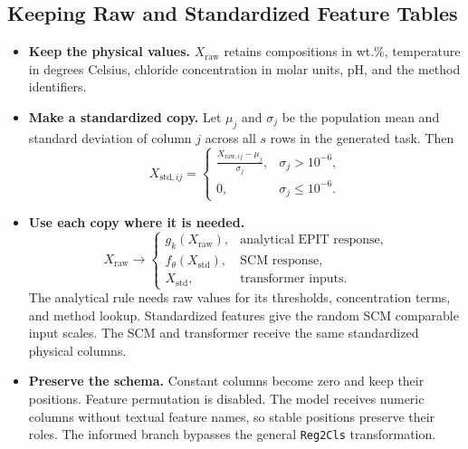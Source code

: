 \documentclass[11pt]{article}
\newenvironment{notes}
  {\begin{itemize}\setlength{\itemsep}{0.45em}\setlength{\parsep}{0pt}}
  {\end{itemize}}
\begin{document}
\subsection{Keeping Raw and Standardized Feature Tables}
\label{sec:feature-standardization}

\begin{notes}
    \item \textbf{Keep the physical values.}
    \(X_{\mathrm{raw}}\) retains compositions in wt.\%,
    temperature in degrees Celsius, chloride concentration in
    molar units, pH, and the method identifiers.

    \item \textbf{Make a standardized copy.}
    Let \(\mu_j\) and \(\sigma_j\) be the population mean and
    standard deviation of column \(j\) across all \(s\) rows
    in the generated task. Then
    \begin{equation}
        X_{\mathrm{std},ij}
        =
        \begin{cases}
            \displaystyle
            \frac{X_{\mathrm{raw},ij}-\mu_j}{\sigma_j},
                & \sigma_j>10^{-6},\\[6pt]
            0,  & \sigma_j\leq10^{-6}.
        \end{cases}
        \label{eq:feature-standardization}
    \end{equation}

    \item \textbf{Use each copy where it is needed.}
    \begin{equation}
        X_{\mathrm{raw}}\longrightarrow
        \begin{cases}
            g_k(X_{\mathrm{raw}}),
                & \text{analytical EPIT response},\\
            f_\theta(X_{\mathrm{std}}),
                & \text{SCM response},\\
            X_{\mathrm{std}},
                & \text{transformer inputs}.
        \end{cases}
        \label{eq:informed-pipeline}
    \end{equation}
    The analytical rule needs raw values for its thresholds,
    concentration terms, and method lookup. Standardized
    features give the random SCM comparable input scales.
    The SCM and transformer receive the same standardized
    physical columns.

    \item \textbf{Preserve the schema.} Constant columns become
    zero and keep their positions. Feature permutation is
    disabled. The model receives numeric columns without
    textual feature names, so stable positions preserve their
    roles. The informed branch bypasses the general
    \texttt{Reg2Cls} transformation.


\end{notes}
\end{document}
